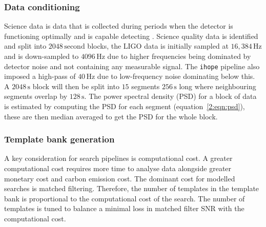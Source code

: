 \subsubsection{Data conditioning}

Science data is \gwadj data that is collected during periods when the detector is functioning optimally and is capable detecting \gws. Science quality data is identified and split into $2048 \, \text{second}$ blocks, the LIGO data is initially sampled at $16,384 \, \text{Hz}$ and is down-sampled to $4096 \, \text{Hz}$ due to higher frequencies being dominated by detector noise and not containing any measurable \gwadj signal. The \texttt{ihope} pipeline also imposed a high-pass of $40 \, \text{Hz}$ due to low-frequency noise dominating below this. A $2048 \, \text{s}$ block will then be split into $15$ segments $256 \, \text{s}$ long where neighbouring segments overlap by $128 \, \text{s}$. The power spectral density (PSD) for a block of data is estimated by computing the PSD for each segment (equation~\ref{2:eqn:psd}), these are then median averaged to get the PSD for the whole block.

\subsubsection{Template bank generation}

A key consideration for \gwadj search pipelines is computational cost. A greater computational cost requires more time to analyse \gwadj data alongside greater monetary cost and carbon emission cost. The dominant cost for modelled searches is matched filtering. Therefore, the number of templates in the template bank is proportional to the computational cost of the search. The number of templates is tuned to balance a minimal loss in matched filter SNR with the computational cost.

